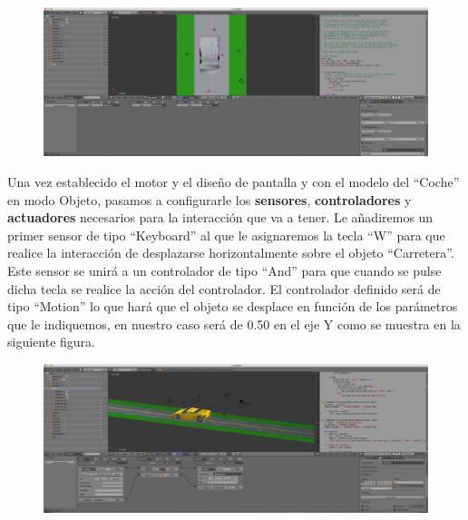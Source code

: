 \documentclass[10pt]{article}
\begin{document}
\begin{figure}[H]
	\begin{center}
	 		\includegraphics[width = 1.00\textwidth]{Imagenes/p4-img2}
	\end{center} 
\end{figure}

Una vez establecido el motor y el diseño de pantalla y con el modelo del ``Coche'' en modo Objeto, pasamos a configurarle los \textbf{sensores}, \textbf{controladores} y \textbf{actuadores} necesarios para la interacción que va a tener. Le añadiremos un primer sensor de tipo ``Keyboard'' al que le asignaremos la tecla ``W'' para que realice la interacción de desplazarse horizontalmente sobre el objeto ``Carretera''. Este sensor se unirá a un controlador de tipo ``And'' para que cuando se pulse dicha tecla se realice la acción del controlador. El controlador definido será de tipo ``Motion'' lo que hará que el objeto se desplace en función de los parámetros que le indiquemos, en nuestro caso será de 0.50 en el eje Y como se muestra en la siguiente figura. \\

\begin{figure}[H]
	\begin{center}
	 		\includegraphics[width = 1.00\textwidth]{Imagenes/p4-img3}
	\end{center} 
\end{figure}
\end{document}
